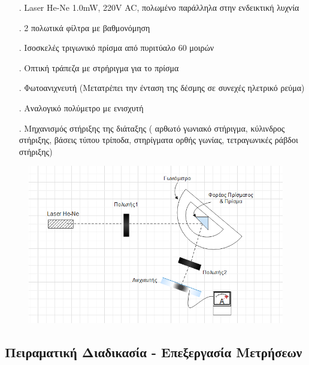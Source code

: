 \documentclass[a4paper]{article}
\begin{document}
\begin{itemize}

\item[.] Laser He-Ne 1.0mW, 220V AC, πολωμένο παράλληλα στην ενδεικτική λυχνία
\item[.] 2 πολωτικά φίλτρα με βαθμονόμηση 
\item[.] Ισοσκελές τριγωνικό πρίσμα από πυριτύαλο 60 μοιρών
\item[.] Οπτική τράπεζα με στρήριγμα για το πρίσμα 
\item[.] Φωτοανιχνευτή (Μετατρέπει την ένταση της δέσμης σε συνεχές ηλετρικό ρεύμα) 
\item[.] Αναλογικό πολύμετρο με ενισχυτή 
\item[.] Μηχανισμός στήριξης της διάταξης ( αρθωτό γωνιακό στήριγμα, κύλινδρος στήριξης, βάσεις τύπου τρίποδα, 					στηρίγματα ορθής γωνίας, τετραγωνικές ράβδοι στήριξης) 
\end{itemize}

\hfill 

	\begin{figure}[h!]
		\includegraphics[scale=0.4]{setup.png}
	\end{figure}



\subsection*{Πειραματική Διαδικασία - Επεξεργασία Μετρήσεων}
\end{document}
